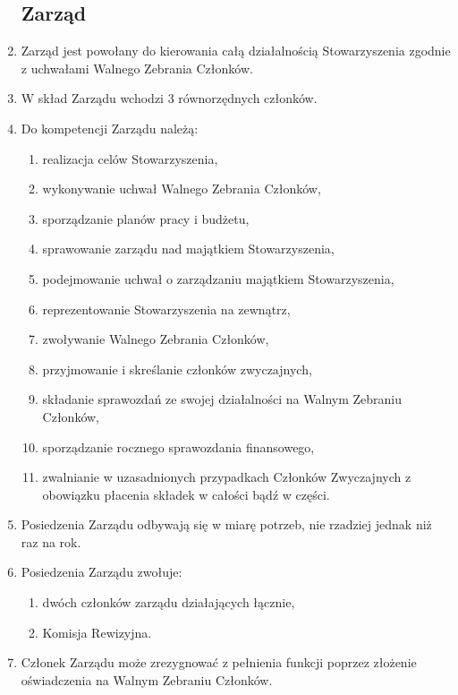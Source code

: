 \documentclass{article}
\begin{document}
\begin{enumerate}
	\subsection{Zarząd}
	    \item Zarząd jest powołany do kierowania całą działalnością Stowarzyszenia zgodnie z uchwałami Walnego Zebrania Członków.
	    \item W skład Zarządu wchodzi 3 równorzędnych członków.
	    \item Do kompetencji Zarządu należą:
	      \begin{enumerate}
	        \item realizacja celów Stowarzyszenia,
	        \item wykonywanie uchwał Walnego Zebrania Członków,
	        \item sporządzanie planów pracy i budżetu,
	        \item sprawowanie zarządu nad majątkiem Stowarzyszenia,
	        \item podejmowanie uchwał o zarządzaniu majątkiem Stowarzyszenia,
	        \item reprezentowanie Stowarzyszenia na zewnątrz,
	        \item zwoływanie Walnego Zebrania Członków,
	        \item przyjmowanie i skreślanie członków zwyczajnych,
	        \item składanie sprawozdań ze swojej działalności na Walnym Zebraniu Członków,
	        \item sporządzanie rocznego sprawozdania finansowego,
	        \item zwalnianie w uzasadnionych przypadkach Członków Zwyczajnych z obowiązku płacenia składek w całości bądź w części.
	      \end{enumerate}
	    \item Posiedzenia Zarządu odbywają się w miarę potrzeb, nie rzadziej jednak niż raz na rok.
	    \item Posiedzenia Zarządu zwołuje:
	      \begin{enumerate}
	        \item dwóch członków zarządu działających łącznie,
	        \item Komisja Rewizyjna.
	      \end{enumerate}
	    \item Członek Zarządu może zrezygnować z pełnienia funkcji poprzez złożenie oświadczenia na Walnym Zebraniu Członków.

\end{enumerate}
\end{document}
